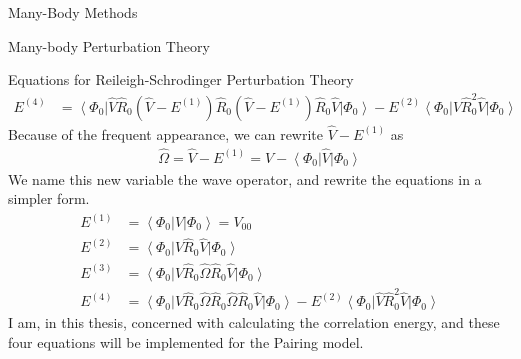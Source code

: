 \documentclass[twoside,english]{uiofysmaster}
\begin{document}
\begin{chapter}{Many-Body Methods}
\begin{section}{Many-body Perturbation Theory}
\begin{subsection}{Equations for Reileigh-Schrodinger Perturbation Theory}
\begin{align*}
	 			E^{(4)} &= \left< \Phi_0 \right| \hat V \hat R_0 (\hat V - E^{(1)})  \hat R_0 (\hat V - E^{(1)}) \hat R_0 \hat V \left| \Phi_0 \right> 
	 					- E^{(2)} \left< \Phi_0 \right| \hat V \hat R_0^2 \hat V \left| \Phi_0 \right>
	  		\end{align*}
	  		Because of the frequent appearance, we can rewrite $\hat V - E^{(1)}$ as
	  		\begin{align}
	  			\hat \Omega = \hat V - E^{(1)} = \hat V - \left< \Phi_0 \right| \hat V \left| \Phi_0 \right>
	  		\end{align}
	  		We name this new variable the wave operator, and rewrite the equations in a simpler form. 
	  		\begin{align*}
	 			E^{(1)} &= \left< \Phi_0 \right| \hat V \left| \Phi_0 \right>  = V_{00}\\
	 			E^{(2)} &= \left< \Phi_0 \right| \hat V \hat R_0 \hat V \left| \Phi_0 \right> \\
	 			E^{(3)} &= \left< \Phi_0 \right| \hat V \hat R_0 \hat \Omega \hat R_0 \hat V \left| \Phi_0 \right> \\
	 			E^{(4)} &= \left< \Phi_0 \right| \hat V \hat R_0 \hat \Omega  \hat R_0 \hat \Omega \hat R_0 \hat V \left| \Phi_0 \right> 
	 					- E^{(2)} \left< \Phi_0 \right| \hat V \hat R_0^2 \hat V \left| \Phi_0 \right>
	 			\label{MBPT equations}
	  		\end{align*}
	  		I am, in this thesis, concerned with calculating the correlation energy, and these four equations will be implemented for the Pairing model. 
	 	\end{subsection}
	\end{section}


\end{chapter}
\end{document}
